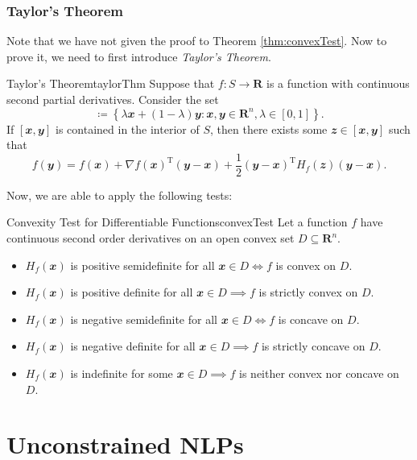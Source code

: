 \documentclass[math, code]{amznotes}
\theoremstyle{remark}
\begin{document}
\subsection{Taylor's Theorem}
Note that we have not given the proof to Theorem \ref{thm:convexTest}. Now to prove it, we need to first introduce \textit{Taylor's Theorem}.
\begin{thmbox}{Taylor's Theorem}{taylorThm}
    Suppose that $f \colon S \to \mathbf{R}$ is a function with continuous second partial derivatives. Consider the set
    \begin{displaymath}
        [\mathbfit{x}, \mathbfit{y}] \coloneqq \left\{\lambda\mathbfit{x} + (1 - \lambda)\mathbfit{y} \colon \mathbfit{x}, \mathbfit{y} \in \mathbf{R}^n, \lambda \in [0, 1]\right\}.
    \end{displaymath}
    If $[\mathbfit{x}, \mathbfit{y}]$ is contained in the interior of $S$, then there exists some $\mathbfit{z} \in [\mathbfit{x}, \mathbfit{y}]$ such that
    \begin{equation*}
        f(\mathbfit{y}) = f(\mathbfit{x}) + \nabla f(\mathbfit{x})^{\mathrm{T}}(\mathbfit{y - x}) + \frac{1}{2}(\mathbfit{y - x})^{\mathrm{T}}H_f(\mathbfit{z})(\mathbfit{y - x}).
    \end{equation*}
\end{thmbox}
Now, we are able to apply the following tests:
\begin{thmbox}{Convexity Test for Differentiable Functions}{convexTest}
    Let a function $f$ have continuous second order derivatives on an open convex set $D \subseteq \mathbf{R}^n$.
    \begin{itemize}
        \item $H_f(\mathbfit{x})$ is positive semidefinite for all $\mathbfit{x} \in D \iff f$ is convex on $D$.
        \item $H_f(\mathbfit{x})$ is positive definite for all $\mathbfit{x} \in D \implies f$ is strictly convex on $D$.
        \item $H_f(\mathbfit{x})$ is negative semidefinite for all $\mathbfit{x} \in D \iff f$ is concave on $D$.
        \item $H_f(\mathbfit{x})$ is negative definite for all $\mathbfit{x} \in D \implies f$ is strictly concave on $D$.
        \item $H_f(\mathbfit{x})$ is indefinite for some $\mathbfit{x} \in D \implies f$ is neither convex nor concave on $D$.
    \end{itemize}
\end{thmbox}
\chapter{Unconstrained NLPs}
\end{document}
